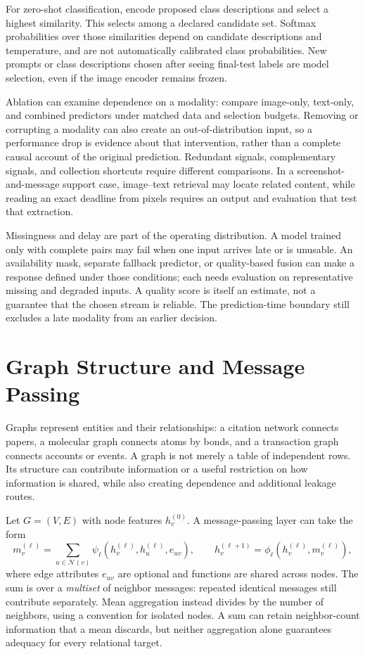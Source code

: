 For zero-shot classification, encode proposed class descriptions and select a highest similarity. This selects among a declared candidate set. Softmax probabilities over those similarities depend on candidate descriptions and temperature, and are not automatically calibrated class probabilities. New prompts or class descriptions chosen after seeing final-test labels are model selection, even if the image encoder remains frozen.

Ablation can examine dependence on a modality: compare image-only, text-only, and combined predictors under matched data and selection budgets. Removing or corrupting a modality can also create an out-of-distribution input, so a performance drop is evidence about that intervention, rather than a complete causal account of the original prediction. Redundant signals, complementary signals, and collection shortcuts require different comparisons. In a screenshot-and-message support case, image--text retrieval may locate related content, while reading an exact deadline from pixels requires an output and evaluation that test that extraction.

Missingness and delay are part of the operating distribution. A model trained only with complete pairs may fail when one input arrives late or is unusable. An availability mask, separate fallback predictor, or quality-based fusion can make a response defined under those conditions; each needs evaluation on representative missing and degraded inputs. A quality score is itself an estimate, not a guarantee that the chosen stream is reliable. The prediction-time boundary still excludes a late modality from an earlier decision.

\section{Graph Structure and Message Passing}
\label{sec:graph-extension}

Graphs represent entities and their relationships: a citation network connects papers, a molecular graph connects atoms by bonds, and a transaction graph connects accounts or events. A graph is not merely a table of independent rows. Its structure can contribute information or a useful restriction on how information is shared, while also creating dependence and additional leakage routes.

Let $G=(V,E)$ with node features $h_v^{(0)}$. A message-passing layer can take the form
\[
 m_v^{(\ell)}=\sum_{u\in\mathcal N(v)}
 \psi_\ell(h_v^{(\ell)},h_u^{(\ell)},e_{uv}),\qquad
 h_v^{(\ell+1)}=\phi_\ell(h_v^{(\ell)},m_v^{(\ell)}),
\]
where edge attributes $e_{uv}$ are optional and functions are shared across nodes. The sum is over a \emph{multiset} of neighbor messages: repeated identical messages still contribute separately. Mean aggregation instead divides by the number of neighbors, using a convention for isolated nodes. A sum can retain neighbor-count information that a mean discards, but neither aggregation alone guarantees adequacy for every relational target.

